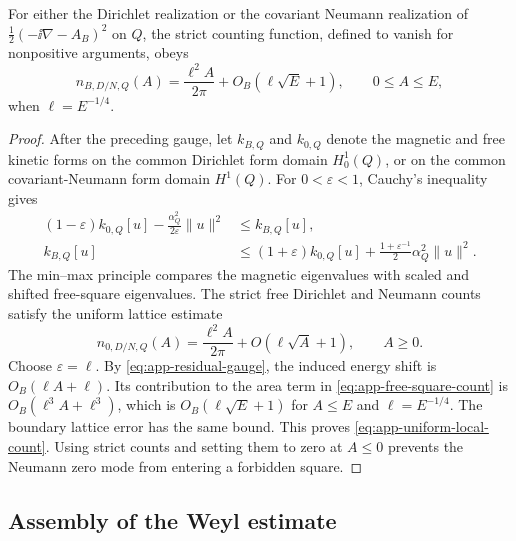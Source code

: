 \begin{lemma}
\label{lem:local-magnetic-count}
For either the Dirichlet realization or the covariant Neumann realization of
\(\frac12(-\ii\nabla-A_B)^2\) on \(Q\), the strict counting function,
defined to vanish for nonpositive arguments, obeys
\begin{equation}
 n_{B,D/N,Q}(A)
 =\frac{\ell^2A}{2\pi}+O_B(\ell\sqrt E+1),
 \qquad 0\leq A\leq E,
 \label{eq:app-uniform-local-count}
\end{equation}
when \(\ell=E^{-1/4}\).
\end{lemma}

\begin{proof}
After the preceding gauge, let \(k_{B,Q}\) and \(k_{0,Q}\) denote the
magnetic and free kinetic forms on the common Dirichlet form domain
\(H_0^1(Q)\), or on the common covariant-Neumann form domain \(H^1(Q)\).
For \(0<\varepsilon<1\), Cauchy's inequality gives
\begin{align}
 (1-\varepsilon)k_{0,Q}[u]
 -\frac{\alpha_Q^2}{2\varepsilon}\|u\|^2
 &\leq k_{B,Q}[u],
 \label{eq:app-form-lower}\\
 k_{B,Q}[u]
 &\leq(1+\varepsilon)k_{0,Q}[u]
 +\frac{1+\varepsilon^{-1}}{2}\alpha_Q^2\|u\|^2.
 \label{eq:app-form-upper}
\end{align}
The min--max principle compares the magnetic eigenvalues with scaled and
shifted free-square eigenvalues.  The strict free Dirichlet and Neumann
counts satisfy the uniform lattice estimate
\begin{equation}
 n_{0,D/N,Q}(A)
 =\frac{\ell^2A}{2\pi}+O(\ell\sqrt A+1),
 \qquad A\geq0.
 \label{eq:app-free-square-count}
\end{equation}
Choose \(\varepsilon=\ell\).  By
\cref{eq:app-residual-gauge}, the induced energy shift is
\(O_B(\ell A+\ell)\).  Its contribution to the area term in
\cref{eq:app-free-square-count} is \(O_B(\ell^3A+\ell^3)\), which is
\(O_B(\ell\sqrt E+1)\) for \(A\leq E\) and
\(\ell=E^{-1/4}\).  The boundary lattice error has the same bound.  This
proves \cref{eq:app-uniform-local-count}.  Using strict counts and setting
them to zero at \(A\leq0\) prevents the Neumann zero mode from entering a
forbidden square.
\end{proof}

\subsection{Assembly of the Weyl estimate}
\label{app:weyl-assembly}

